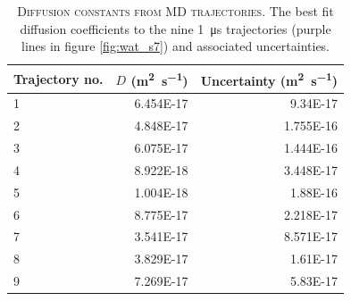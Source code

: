 \begin{table}
    \centering
    \caption[Diffusion constants from MD trajectories]{\textsc{Diffusion constants from MD trajectories}. The best fit diffusion coefficients to the nine \SI{1}{\micro\second} trajectories (purple lines in figure \ref{fig:wat_s7}) and associated uncertainties.}
    \begin{tabular}{lrr}
    \toprule
    Trajectory no. & $D$ (\si{\meter\squared\per\second}) & Uncertainty  (\si{\meter\squared\per\second})  \\
    \midrule
    1 &	6.454E-17	& 9.34E-17 \\
    2 &	4.848E-17	& 1.755E-16 \\
    3 &	6.075E-17	& 1.444E-16 \\
    4 &	8.922E-18	& 3.448E-17 \\
    5 &	1.004E-18	& 1.88E-16 \\
    6 &	8.775E-17	& 2.218E-17 \\
    7 &	3.541E-17	& 8.571E-17 \\
    8 &	3.829E-17	& 1.61E-17 \\
    9 &	7.269E-17	& 5.83E-17 \\
    \bottomrule
    \end{tabular}
    \label{tab:wat_s2}
\end{table}

